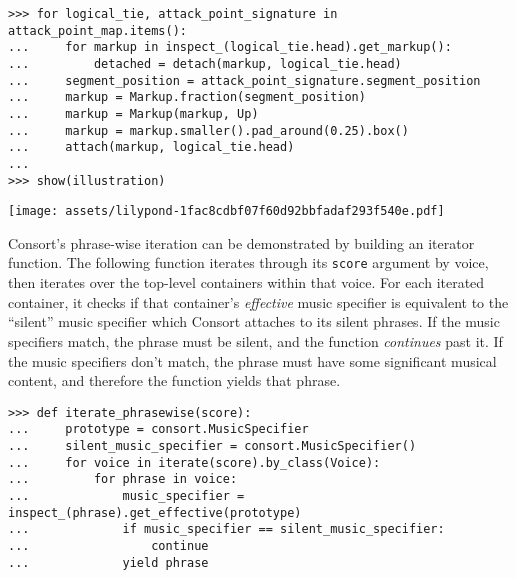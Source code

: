 \begin{abjadbookoutput}
\begin{singlespacing}
\vspace{-0.5\baselineskip}
\begin{verbatim}
>>> for logical_tie, attack_point_signature in attack_point_map.items():
...     for markup in inspect_(logical_tie.head).get_markup():
...         detached = detach(markup, logical_tie.head)
...     segment_position = attack_point_signature.segment_position
...     markup = Markup.fraction(segment_position)
...     markup = Markup(markup, Up)
...     markup = markup.smaller().pad_around(0.25).box()
...     attach(markup, logical_tie.head)
...
>>> show(illustration)
\end{verbatim}
\noindent\texttt{[image: assets/lilypond-1fac8cdbf07f60d92bbfadaf293f540e.pdf]}
\end{singlespacing}
\end{abjadbookoutput}

\noindent Consort's phrase-wise iteration can be demonstrated by building an
iterator function. The following function iterates through its \texttt{score}
argument by voice, then iterates over the top-level containers within that
voice. For each iterated container, it checks if that container's
\emph{effective} music specifier is equivalent to the \enquote{silent} music
specifier which Consort attaches to its silent phrases. If the music specifiers
match, the phrase must be silent, and the function \emph{continues} past it. If
the music specifiers don't match, the phrase must have some significant musical
content, and therefore the function yields that phrase.

\begin{comment}
<abjad>[stylesheet=../consort.ily]
def iterate_phrasewise(score):
    prototype = consort.MusicSpecifier
    silent_music_specifier = consort.MusicSpecifier()
    for voice in iterate(score).by_class(Voice):
        for phrase in voice:
            music_specifier = inspect_(phrase).get_effective(prototype)
            if music_specifier == silent_music_specifier:
                continue
            yield phrase
</abjad>
\end{comment}

\begin{abjadbookoutput}
\begin{singlespacing}
\vspace{-0.5\baselineskip}
\begin{verbatim}
>>> def iterate_phrasewise(score):
...     prototype = consort.MusicSpecifier
...     silent_music_specifier = consort.MusicSpecifier()
...     for voice in iterate(score).by_class(Voice):
...         for phrase in voice:
...             music_specifier = inspect_(phrase).get_effective(prototype)
...             if music_specifier == silent_music_specifier:
...                 continue
...             yield phrase
\end{verbatim}
\end{singlespacing}
\end{abjadbookoutput}

